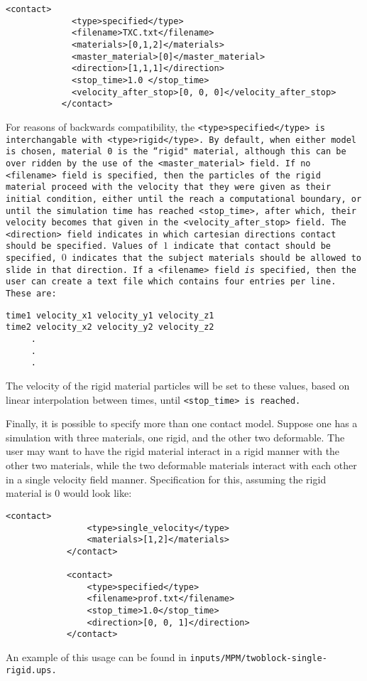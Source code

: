 \begin{Verbatim}[fontsize=\footnotesize]
           <contact>
             <type>specified</type>
             <filename>TXC.txt</filename>
             <materials>[0,1,2]</materials>
             <master_material>[0]</master_material>
             <direction>[1,1,1]</direction>
             <stop_time>1.0 </stop_time>
             <velocity_after_stop>[0, 0, 0]</velocity_after_stop>
           </contact>
\end{Verbatim}
For reasons of backwards compatibility, the
\tt <type>specified</type> \normalfont is interchangable with
\tt <type>rigid</type>. \normalfont  By default, when either model is
chosen, material 0 is the ``rigid" material, although this can be
over ridden by the use of the
\tt <master\_material> \normalfont field.  If no
\tt <filename> \normalfont field is specified, then the particles of the
rigid material proceed with the velocity that they were given as their
initial condition, either until the reach a computational boundary, or
until the simulation time has reached \tt <stop\_time>, \normalfont after
which, their velocity becomes that given in the
\tt <velocity\_after\_stop> \normalfont field.  The \tt <direction> \normalfont
field indicates in which cartesian directions contact should be specified.
Values of $1$ indicate that contact should be specified, $0$ indicates that
the subject materials should be allowed to slide in that direction.  If
a \tt <filename> \normalfont field {\it is} specified, then the user can
create a text file which contains four entries per line.  These are:
\begin{Verbatim}[fontsize=\footnotesize]
time1 velocity_x1 velocity_y1 velocity_z1
time2 velocity_x2 velocity_y2 velocity_z2
     .
     .
     .
\end{Verbatim}
The velocity of the rigid material particles will be set to these values,
based on linear interpolation between times, until \tt <stop\_time> \normalfont
is reached.

Finally, it is possible to specify more than one contact model.  Suppose
one has a simulation with three materials, one rigid, and the other two
deformable.  The user may want to have the rigid material interact in a
rigid manner with the other two materials, while the two deformable materials
interact with each other in a single velocity field manner.  Specification
for this, assuming the rigid material is $0$ would look like:

\begin{Verbatim}[fontsize=\footnotesize]
            <contact>
                <type>single_velocity</type>
                <materials>[1,2]</materials>
            </contact>

            <contact>
                <type>specified</type>
                <filename>prof.txt</filename>
                <stop_time>1.0</stop_time>
                <direction>[0, 0, 1]</direction>
            </contact>
\end{Verbatim}
An example of this usage can be found in \tt inputs/MPM/twoblock-single-rigid.ups. \normalfont

